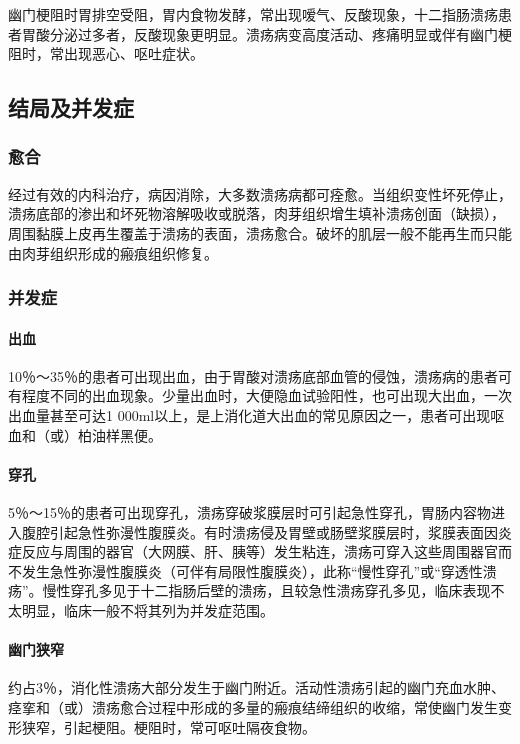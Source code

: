 幽门梗阻时胃排空受阻，胃内食物发酵，常出现嗳气、反酸现象，十二指肠溃疡患者胃酸分泌过多者，反酸现象更明显。溃疡病变高度活动、疼痛明显或伴有幽门梗阻时，常出现恶心、呕吐症状。

\subsection{结局及并发症}

\subsubsection{愈合}

经过有效的内科治疗，病因消除，大多数溃疡病都可痊愈。当组织变性坏死停止，溃疡底部的渗出和坏死物溶解吸收或脱落，肉芽组织增生填补溃疡创面（缺损），周围黏膜上皮再生覆盖于溃疡的表面，溃疡愈合。破坏的肌层一般不能再生而只能由肉芽组织形成的瘢痕组织修复。

\subsubsection{并发症}

\paragraph{出血}
10％～35％的患者可出现出血，由于胃酸对溃疡底部血管的侵蚀，溃疡病的患者可有程度不同的出血现象。少量出血时，大便隐血试验阳性，也可出现大出血，一次出血量甚至可达1
000ml以上，是上消化道大出血的常见原因之一，患者可出现呕血和（或）柏油样黑便。

\paragraph{穿孔}
5％～15％的患者可出现穿孔，溃疡穿破浆膜层时可引起急性穿孔，胃肠内容物进入腹腔引起急性弥漫性腹膜炎。有时溃疡侵及胃壁或肠壁浆膜层时，浆膜表面因炎症反应与周围的器官（大网膜、肝、胰等）发生粘连，溃疡可穿入这些周围器官而不发生急性弥漫性腹膜炎（可伴有局限性腹膜炎），此称“慢性穿孔”或“穿透性溃疡”。慢性穿孔多见于十二指肠后壁的溃疡，且较急性溃疡穿孔多见，临床表现不太明显，临床一般不将其列为并发症范围。

\paragraph{幽门狭窄}
约占3％，消化性溃疡大部分发生于幽门附近。活动性溃疡引起的幽门充血水肿、痉挛和（或）溃疡愈合过程中形成的多量的瘢痕结缔组织的收缩，常使幽门发生变形狭窄，引起梗阻。梗阻时，常可呕吐隔夜食物。

